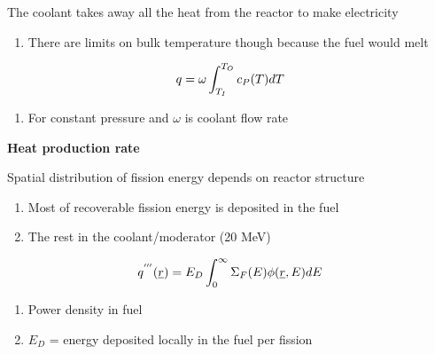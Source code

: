 \documentclass[aspectratio=1610,pdftex,dvipsnames,compress,xcolor={dvipsnames}]{beamer}
\begin{document}
\addtocounter{framenumber}{-1} 
\begin{frame}{The coolant takes away all the heat from the reactor to make electricity}
    \begin{enumerate}[series=outerlist,topsep=0pt,itemsep=21pt,leftmargin=*,label=(\arabic*)]
        \item[]There are limits on bulk temperature though because the fuel would melt
    \end{enumerate}

    \vspace*{\fill}

    \begin{equation}
        \LARGE
        q = \omega \int_{T_I}^{T_O} c_P(T) dT
    \end{equation}

    \vspace*{\fill}

    \begin{enumerate}[series=outerlist,topsep=0pt,itemsep=21pt,leftmargin=*,label=(\arabic*)]
        \item[]For constant pressure and $\omega$ is coolant flow rate
    \end{enumerate}
\end{frame}


\begin{frame}[plain]{}
    \centering\LARGE\textbf{Heat production rate}
\end{frame}


\addtocounter{framenumber}{-1} 
\begin{frame}{Spatial distribution of fission energy depends on reactor structure}
    \begin{enumerate}[series=outerlist,topsep=0pt,itemsep=21pt,leftmargin=*,label=(\arabic*)]
        \item[]Most of recoverable fission energy is deposited in the fuel
        \item[]The rest in the coolant/moderator (20 MeV)
    \end{enumerate}

    \vspace*{\fill}

    \begin{equation}
        \LARGE
        q^{'''}(\underline{r}) = E_D \int_0^{\infty} \Sigma_F(E) \phi(\underline{r},E) dE
    \end{equation}

    \vspace*{\fill}

    \begin{enumerate}[series=outerlist,topsep=0pt,itemsep=21pt,leftmargin=*,label=(\arabic*)]
        \item[]Power density in fuel
        \item[]$E_D$ = energy deposited locally in the fuel per fission
    \end{enumerate}
\end{frame}
\end{document}
